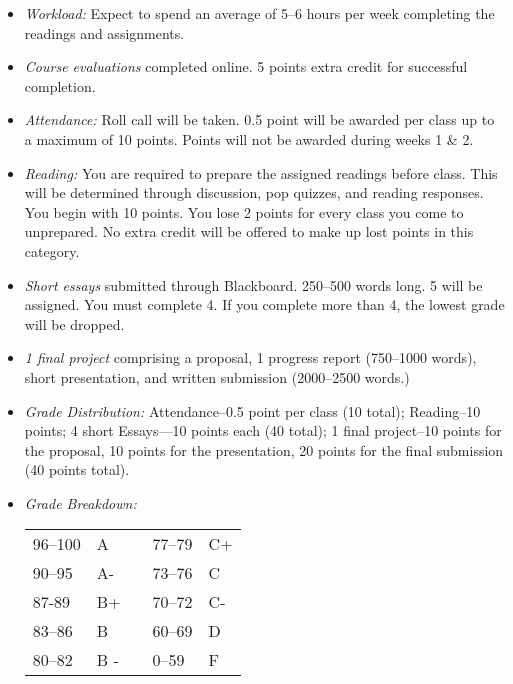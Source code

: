 \documentclass[article,oneside]{memoir}
\begin{document}
\begin{itemize}
\item \textit{Workload:} Expect to spend an average of 5--6 hours per week  completing the readings and assignments.

\item \textit{Course evaluations} completed online. 5 points extra credit for successful completion.

\item \textit{Attendance:} Roll call will be taken. 0.5 point will be awarded per class up to a maximum of 10 points. Points will not be awarded during weeks 1 \& 2. 

\item \textit{Reading:} You are required to prepare the assigned readings before class. This will be determined through discussion, pop quizzes, and reading responses. You begin with 10 points. You lose 2 points for every class you come to unprepared. No extra credit will be offered to make up lost points in this category. 

\item \textit{Short essays} submitted through Blackboard. 250--500 words long. 5 will be assigned. You must complete 4. If you complete more than 4, the lowest grade will be dropped.
 
\item \textit{1 final project} comprising a proposal, 1 progress report (750--1000 words), short presentation, and written submission (2000--2500 words.)



\item \textit{Grade Distribution:} Attendance--0.5 point per class (10 total); Reading--10 points; 4 short Essays---10 points each (40 total); 1 final project--10 points for the proposal, 10 points for the presentation, 20 points for the final submission (40 points total).

\item \textit{Grade Breakdown:}

 \begin{tabular}{ | l | l | p{2cm} | l | l | }
    \hline 
96--100 & A  & &  77--79 &  C+ \\  
90--95 & A- & &  73--76 & C \\
87-89 & B+ &  &  70--72 & C- \\ 
83--86 & B  & &  60--69 & D\\
80--82 & B - & & 0--59 & F\\ \hline
    \end{tabular}


\end{itemize}
\end{document}
